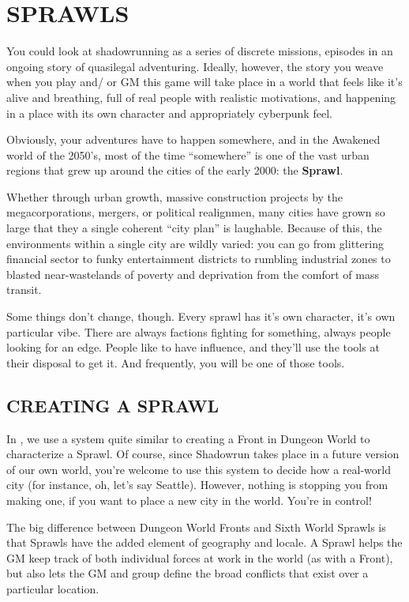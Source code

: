 \documentclass[oneside,10pt]{article}
\begin{document}
\section{SPRAWLS}
\begin{multicols}{2}
You could look at shadowrunning as a series of discrete missions, episodes in an ongoing story of quasilegal adventuring.
Ideally, however, the story you weave when you play and/
or GM this game will take place in a world that feels like it’s
alive and breathing, full of real people with realistic motivations, and happening in a place with its own character and
appropriately cyberpunk feel.

Obviously, your adventures have to happen somewhere,
and in the Awakened world of the 2050’s, most of the time
“somewhere” is one of the vast urban regions that grew up
around the cities of the early 2000: the \textbf{Sprawl}.

Whether through urban growth, massive construction projects
by the megacorporations, mergers, or political realignmen,
many cities have grown so large that they a single coherent
“city plan” is laughable. Because of this, the environments
within a single city are wildly varied: you can go from glittering financial sector to funky entertainment districts to rumbling industrial zones to blasted near-wastelands of poverty
and deprivation from the comfort of mass transit.

Some things don’t change, though. Every sprawl has it’s own
character, it’s own particular vibe. There are always factions
fighting for something, always people looking for an edge.
People like to have influence, and they’ll use the tools at their
disposal to get it. And frequently, you will be one of those
tools.

\subsection{CREATING A SPRAWL}
In \SW{}, we use a system quite similar to creating a
Front in Dungeon World to characterize a Sprawl. Of course,
since Shadowrun takes place in a future version of our own
world, you’re welcome to use this system to decide how a
real-world city (for instance, oh, let’s say Seattle). However,
nothing is stopping you from making one, if you want to
place a new city in the world. You’re in control!

The big difference between Dungeon World Fronts and Sixth
World Sprawls is that Sprawls have the added element of
geography and locale. A Sprawl helps the GM keep track of
both individual forces at work in the world (as with a Front),
but also lets the GM and group define the broad conflicts that
exist over a particular location.


\end{multicols}
\end{document}
